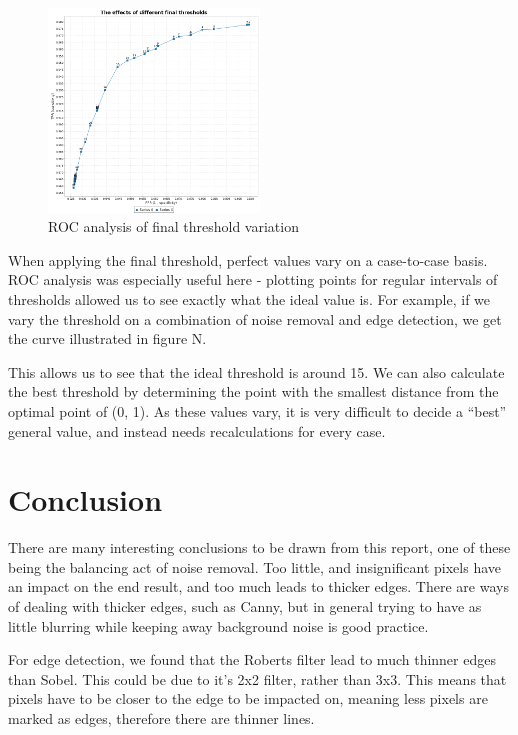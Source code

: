 \documentclass[10pt,a4paper]{article}
\begin{document}
\begin{figure}
\centering
\vspace{-12mm}
\includegraphics[width=0.5\textwidth]{graphs/threshold_example}
\caption{ROC analysis of final threshold variation}
\end{figure}
When applying the final threshold, perfect values vary on a case-to-case basis. ROC analysis was especially useful here - plotting points for regular intervals of thresholds allowed us to see exactly what the ideal value is. For example, if we vary the threshold on a combination of noise removal and edge detection, we get the curve illustrated in figure N.

This allows us to see that the ideal threshold is around 15. We can also calculate the best threshold by determining the point with the smallest distance from the optimal point of (0, 1). As these values vary, it is very difficult to decide a “best” general value, and instead needs recalculations for every case.



\vspace{8mm}


\section*{Conclusion}
There are many interesting conclusions to be drawn from this report, one of these being the balancing act of noise removal. Too little, and insignificant pixels have an impact on the end result, and too much leads to thicker edges. There are ways of dealing with thicker edges, such as Canny, but in general trying to have as little blurring while keeping away background noise is good practice.

For edge detection, we found that the Roberts filter lead to much thinner edges than Sobel. This could be due to it’s 2x2 filter, rather than 3x3. This means that pixels have to be closer to the edge to be impacted on, meaning less pixels are marked as edges, therefore there are thinner lines.
\end{document}
